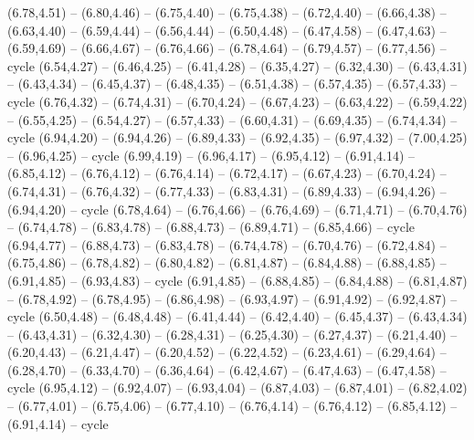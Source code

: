 \expandafter\def\csname geo:gebiet:POL\endcsname{
  (6.78,4.51) -- (6.80,4.46) -- (6.75,4.40) -- (6.75,4.38) -- (6.72,4.40) -- (6.66,4.38) -- (6.63,4.40) -- (6.59,4.44) -- (6.56,4.44) -- (6.50,4.48) -- (6.47,4.58) -- (6.47,4.63) -- (6.59,4.69) -- (6.66,4.67) -- (6.76,4.66) -- (6.78,4.64) -- (6.79,4.57) -- (6.77,4.56) -- cycle}
\expandafter\def\csname geo:gebiet:AUT\endcsname{
  (6.54,4.27) -- (6.46,4.25) -- (6.41,4.28) -- (6.35,4.27) -- (6.32,4.30) -- (6.43,4.31) -- (6.43,4.34) -- (6.45,4.37) -- (6.48,4.35) -- (6.51,4.38) -- (6.57,4.35) -- (6.57,4.33) -- cycle}
\expandafter\def\csname geo:gebiet:HUN\endcsname{
  (6.76,4.32) -- (6.74,4.31) -- (6.70,4.24) -- (6.67,4.23) -- (6.63,4.22) -- (6.59,4.22) -- (6.55,4.25) -- (6.54,4.27) -- (6.57,4.33) -- (6.60,4.31) -- (6.69,4.35) -- (6.74,4.34) -- cycle}
\expandafter\def\csname geo:gebiet:MDA\endcsname{
  (6.94,4.20) -- (6.94,4.26) -- (6.89,4.33) -- (6.92,4.35) -- (6.97,4.32) -- (7.00,4.25) -- (6.96,4.25) -- cycle}
\expandafter\def\csname geo:gebiet:ROU\endcsname{
  (6.99,4.19) -- (6.96,4.17) -- (6.95,4.12) -- (6.91,4.14) -- (6.85,4.12) -- (6.76,4.12) -- (6.76,4.14) -- (6.72,4.17) -- (6.67,4.23) -- (6.70,4.24) -- (6.74,4.31) -- (6.76,4.32) -- (6.77,4.33) -- (6.83,4.31) -- (6.89,4.33) -- (6.94,4.26) -- (6.94,4.20) -- cycle}
\expandafter\def\csname geo:gebiet:LTU\endcsname{
  (6.78,4.64) -- (6.76,4.66) -- (6.76,4.69) -- (6.71,4.71) -- (6.70,4.76) -- (6.74,4.78) -- (6.83,4.78) -- (6.88,4.73) -- (6.89,4.71) -- (6.85,4.66) -- cycle}
\expandafter\def\csname geo:gebiet:LVA\endcsname{
  (6.94,4.77) -- (6.88,4.73) -- (6.83,4.78) -- (6.74,4.78) -- (6.70,4.76) -- (6.72,4.84) -- (6.75,4.86) -- (6.78,4.82) -- (6.80,4.82) -- (6.81,4.87) -- (6.84,4.88) -- (6.88,4.85) -- (6.91,4.85) -- (6.93,4.83) -- cycle}
\expandafter\def\csname geo:gebiet:EST\endcsname{
  (6.91,4.85) -- (6.88,4.85) -- (6.84,4.88) -- (6.81,4.87) -- (6.78,4.92) -- (6.78,4.95) -- (6.86,4.98) -- (6.93,4.97) -- (6.91,4.92) -- (6.92,4.87) -- cycle}
\expandafter\def\csname geo:gebiet:DEU\endcsname{
  (6.50,4.48) -- (6.48,4.48) -- (6.41,4.44) -- (6.42,4.40) -- (6.45,4.37) -- (6.43,4.34) -- (6.43,4.31) -- (6.32,4.30) -- (6.28,4.31) -- (6.25,4.30) -- (6.27,4.37) -- (6.21,4.40) -- (6.20,4.43) -- (6.21,4.47) -- (6.20,4.52) -- (6.22,4.52) -- (6.23,4.61) -- (6.29,4.64) -- (6.28,4.70) -- (6.33,4.70) -- (6.36,4.64) -- (6.42,4.67) -- (6.47,4.63) -- (6.47,4.58) -- cycle}
\expandafter\def\csname geo:gebiet:BGR\endcsname{
  (6.95,4.12) -- (6.92,4.07) -- (6.93,4.04) -- (6.87,4.03) -- (6.87,4.01) -- (6.82,4.02) -- (6.77,4.01) -- (6.75,4.06) -- (6.77,4.10) -- (6.76,4.14) -- (6.76,4.12) -- (6.85,4.12) -- (6.91,4.14) -- cycle}
